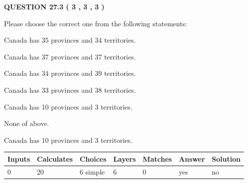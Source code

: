 \documentclass[12pt]{article}
\begin{document}
{\textbf{\Large{QUESTION
27.3 
 (           3 ,           3 ,           3 )
}}}
  
  
Please choose the correct one from the following statements:
 
 
Canada has  %
35 provinces and  %
34 territories.
 
 
Canada has  %
37 provinces and  %
37 territories.
 
 
Canada has  %
34 provinces and  %
39 territories.
 
 
Canada has  %
33 provinces and  %
38 territories.
 
 
Canada has  %
10 provinces and  %
3 territories.
 
 
 None of above.
 
 
\noindent{}
 
 
Canada has  %
10 provinces and  %
3 territories.
 
 
\noindent{}
 
 
   
   
   
   
\noindent\begin{tabular}{|l|l|l|l|l|l|l|}
 \hline
Inputs & Calculates & Choices & Layers & Matches & Answer & Solution \\ \hline
           0  & 
          20  & 
           6
  simple  
  & 
           6  & 
           0  & 
  yes & 
  no 
  \\ \hline
 \end{tabular}
   
   
   
   
\noindent{}
   
   
  
\end{document}

